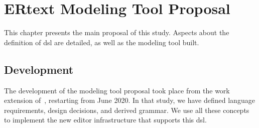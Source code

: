 \chapter{ERtext Modeling Tool Proposal} \label{chap:ERtext}

This chapter presents the main proposal of this study.
Aspects about the definition of \ac{dsl} are detailed, as well as the modeling tool built.

\section{Development} \label{sec_tool:development}

The development of the modeling tool proposal took place from the work extension of~\cite{Lopes:2019}, restarting from June 2020.
In that study, we have defined language requirements, design decisions, and derived grammar.
We use all these concepts to implement the new editor infrastructure that supports this \ac{dsl}.

